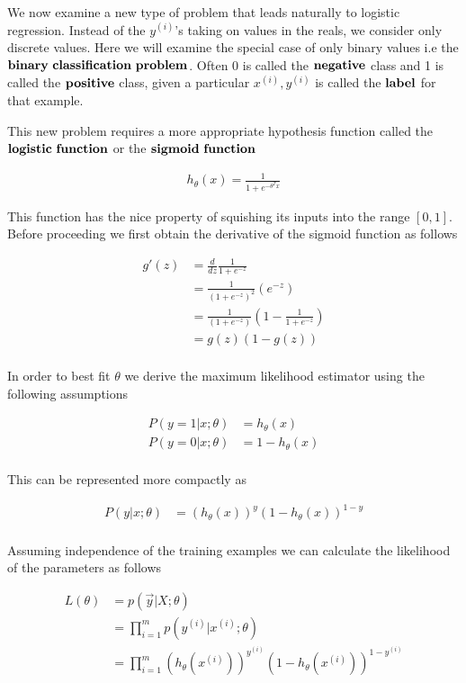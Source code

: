 \documentclass[11pt]{exam}
\newcommand{\idx}[2]{#1^{(#2)}}
\begin{document}
We now examine a new type of problem that leads naturally to logistic regression. Instead of the $\idx{y}{i}$'s taking on values in the reals, we consider only discrete values. Here we will examine the special case of only binary values i.e the $\bf{binary \ classification \ problem}$. Often 0 is called the $\bf{negative}$ class and 1 is called the $\bf{positive}$ class, given a particular $\idx{x}{i}, \idx{y}{i}$ is called the $\bf{label}$ for that example.

This new problem requires a more appropriate hypothesis function called the $\bf{logistic \ function}$ or the $\bf{sigmoid \ function}$ 

\begin{align*}
h_\theta(x) = \frac{1}{1+e^{-\theta^Tx}}
\end{align*}

This function has the nice property of squishing its inputs into the range $[0,1]$. Before proceeding we first obtain the derivative of the sigmoid function as follows

\begin{align*}
g'(z) &= \frac{d}{dz} \frac{1}{1 + e^{-z}}\\
      &= \frac{1}{(1 + e^{-z})^2}(e^{-z})\\
      &= \frac{1}{(1 + e^{-z})}(1 - \frac{1}{1+e^{-z}})\\
      &= g(z)(1-g(z))\\
\end{align*}


In order to best fit $\theta$ we derive the maximum likelihood estimator using the following assumptions

\begin{align*}
P(y = 1| x;\theta) &= h_\theta(x)\\
P(y = 0| x;\theta) &= 1- h_\theta(x)\\
\end{align*}

This can be represented more compactly as

\begin{align*}
P(y | x;\theta) &= (h_\theta(x))^y(1- h_\theta(x))^{1-y}\\
\end{align*}

Assuming independence of the training examples we can calculate the likelihood of the parameters as follows

\begin{align*}
L(\theta) &= p(\vec{y} | X;\theta)\\
          &= \prod_{i=1}^m  p(\idx{y}{i} | \idx{x}{i};\theta)\\
          &= \prod_{i=1}^m(h_\theta(\idx{x}{i}))^{\idx{y}{i}}(1- h_\theta(\idx{x}{i}))^{1-\idx{y}{i}}\\
\end{align*}
\end{document}
